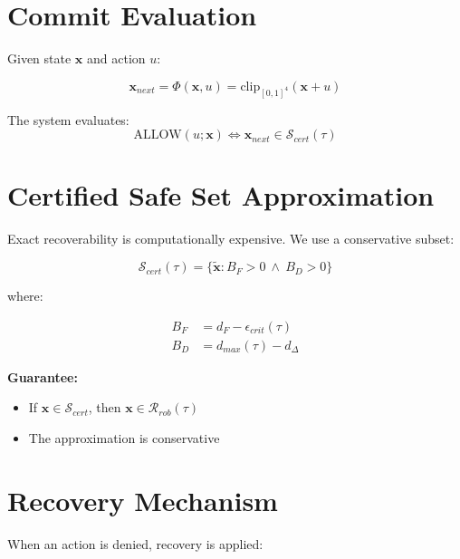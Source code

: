 \documentclass[letterpaper, 10 pt, conference]{ieeeconf}
\begin{document}
\section{Commit Evaluation}

Given state $\mathbf{x}$ and action $u$:

\begin{equation}
\mathbf{x}_{next} = \Phi(\mathbf{x}, u) = \text{clip}_{[0,1]^4}(\mathbf{x} + u)
\end{equation}

The system evaluates:
\begin{equation}
\text{ALLOW}(u;\mathbf{x}) \iff \mathbf{x}_{next} \in \mathcal{S}_{cert}(\tau)
\end{equation}

\section{Certified Safe Set Approximation}

Exact recoverability is computationally expensive. We use a conservative subset:

\begin{equation}
\mathcal{S}_{cert}(\tau) = \{ \tilde{\mathbf{x}} : B_F > 0 \ \wedge \ B_D > 0 \}
\end{equation}

where:

\begin{align}
B_F &= d_F - \epsilon_{crit}(\tau) \\
B_D &= d_{max}(\tau) - d_\Delta
\end{align}

\textbf{Guarantee:}
\begin{itemize}
\item If $\mathbf{x} \in \mathcal{S}_{cert}$, then $\mathbf{x} \in \mathcal{R}_{rob}(\tau)$
\item The approximation is conservative
\end{itemize}

\section{Recovery Mechanism}

When an action is denied, recovery is applied:
\end{document}
